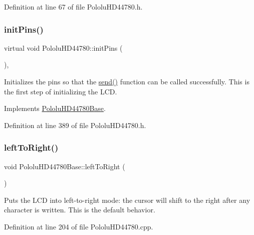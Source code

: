 Definition at line 67 of file Pololu\+H\+D44780.\+h.

\mbox{\label{class_pololu_h_d44780_a876723b26f2dc081bf7f29019079489b}} 
\subsubsection{\texorpdfstring{init\+Pins()}{initPins()}}
{\footnotesize\ttfamily virtual void Pololu\+H\+D44780\+::init\+Pins (\begin{DoxyParamCaption}{ }\end{DoxyParamCaption})\hspace{0.3cm}{\ttfamily [inline]}, {\ttfamily [virtual]}}

Initializes the pins so that the \hyperlink{class_pololu_h_d44780_a8da2db526de9f1e2314cb02c3ba6121a}{send()} function can be called successfully. This is the first step of initializing the L\+CD. 

Implements \hyperlink{class_pololu_h_d44780_base_a9c2a2e0dfb089a6c21aa12a6a5299750}{Pololu\+H\+D44780\+Base}.



Definition at line 389 of file Pololu\+H\+D44780.\+h.

\mbox{\label{class_pololu_h_d44780_base_ada551bdb01681eb57bec325778eb38a6}} 
\subsubsection{\texorpdfstring{left\+To\+Right()}{leftToRight()}}
{\footnotesize\ttfamily void Pololu\+H\+D44780\+Base\+::left\+To\+Right (\begin{DoxyParamCaption}{ }\end{DoxyParamCaption})\hspace{0.3cm}{\ttfamily [inherited]}}

Puts the L\+CD into left-\/to-\/right mode\+: the cursor will shift to the right after any character is written. This is the default behavior. 

Definition at line 204 of file Pololu\+H\+D44780.\+cpp.

